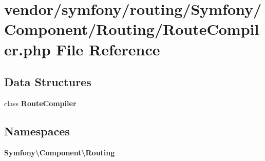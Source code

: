 \section{vendor/symfony/routing/\+Symfony/\+Component/\+Routing/\+Route\+Compiler.php File Reference}
\label{_route_compiler_8php}
\subsection*{Data Structures}
\begin{DoxyCompactItemize}
\item 
class {\bf Route\+Compiler}
\end{DoxyCompactItemize}
\subsection*{Namespaces}
\begin{DoxyCompactItemize}
\item 
 {\bf Symfony\textbackslash{}\+Component\textbackslash{}\+Routing}
\end{DoxyCompactItemize}
